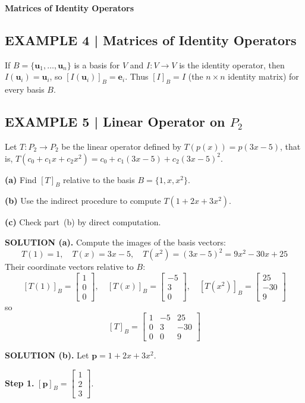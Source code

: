 \documentclass{article}
\newcommand{\redheading}[1]{{\vspace{2mm}\noindent\Large\bfseries\color{red!55!black} #1\par}\vspace{2mm}}
\begin{document}
\redheading{Matrices of Identity Operators}

\subsection*{EXAMPLE 4 | Matrices of Identity Operators}

If $B = \{\mathbf{u}_1, \ldots, \mathbf{u}_n\}$ is a basis for $V$ and $I : V \to V$ is
the identity operator, then $I(\mathbf{u}_i) = \mathbf{u}_i$, so $[I(\mathbf{u}_i)]_B =
\mathbf{e}_i$. Thus $[I]_B = I$ (the $n\times n$ identity matrix) for every basis $B$.

\subsection*{EXAMPLE 5 | Linear Operator on $P_2$}

Let $T : P_2 \to P_2$ be the linear operator defined by $T(p(x)) = p(3x-5)$, that is,
$T(c_0+c_1x+c_2x^2) = c_0+c_1(3x-5)+c_2(3x-5)^2$.

\textbf{(a)} Find $[T]_B$ relative to the basis $B = \{1, x, x^2\}$.

\textbf{(b)} Use the indirect procedure to compute $T(1+2x+3x^2)$.

\textbf{(c)} Check part~(b) by direct computation.

\textbf{SOLUTION (a).} Compute the images of the basis vectors:
\[
  T(1) = 1,\quad T(x) = 3x-5,\quad T(x^2) = (3x-5)^2 = 9x^2-30x+25
\]
Their coordinate vectors relative to $B$:
\[
  [T(1)]_B = \begin{bmatrix}1\\0\\0\end{bmatrix},\quad
  [T(x)]_B = \begin{bmatrix}-5\\3\\0\end{bmatrix},\quad
  [T(x^2)]_B = \begin{bmatrix}25\\-30\\9\end{bmatrix}
\]
so
\[
  [T]_B = \begin{bmatrix}1&-5&25\\0&3&-30\\0&0&9\end{bmatrix}
\]

\textbf{SOLUTION (b).} Let $\mathbf{p} = 1+2x+3x^2$.

\textbf{Step 1.} $[\mathbf{p}]_B = \begin{bmatrix}1\\2\\3\end{bmatrix}$.
\end{document}
